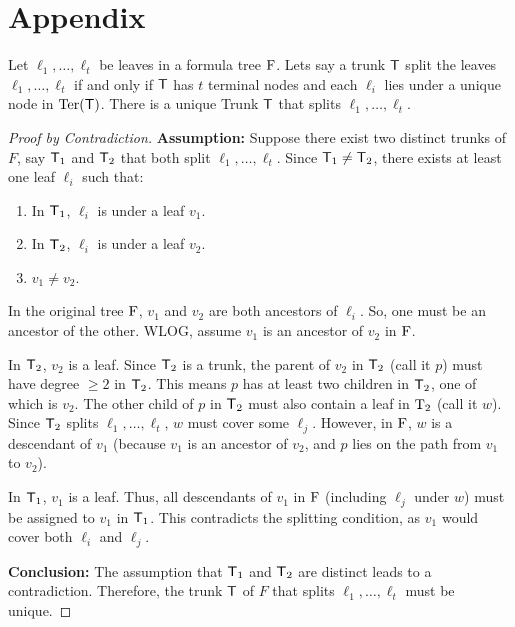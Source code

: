 \section*{Appendix}
\begin{claim}
\label{claim:leaf_branching_uniqueness}
Let $\ell_1, \dots , \ell_t$ be leaves in a formula tree $\rm F$. Lets say a trunk $\mathsf{T}$ split the leaves $\ell_1, \dots , \ell_t$ if and only if $\mathsf{T}$ has $t$ terminal nodes and each $\ell_i$ lies under a unique node in $\mathrm{Ter}(\mathsf{T})$.  
There is a unique Trunk $\mathsf{T}$ that splits $\ell_1, \dots , \ell_t$.
\end{claim}
\begin{proof}[Proof by Contradiction]
\textbf{Assumption:} Suppose there exist two distinct trunks of $F$, say  $\mathsf{T}_1$ and $\mathsf{T}_2$ that both split $\ell_1, \dots , \ell_t$.
Since $\mathsf{T}_1 \neq \mathsf{T}_2$, there exists at least one leaf $\ell_i$ such that:
\begin{enumerate}
    \item In $\mathsf{T}_1$, $\ell_i$ is under a leaf $v_1$.
    \item In $\mathsf{T}_2$, $\ell_i$ is under a leaf $v_2$.
    \item $v_1 \neq v_2$.
\end{enumerate}
In the original tree $\rm F$, $v_1$ and $v_2$ are both ancestors of $\ell_i$. So, one must be an ancestor of the other. WLOG, assume $v_1$ is an ancestor of $v_2$ in $\rm F$.

In $\mathsf{T}_2$, $v_2$ is a leaf. Since $\mathsf{T}_2$ is a trunk, the parent of $v_2$ in $\mathsf{T}_2$ (call it $p$) must have degree $\ge 2$ in $\rm \mathsf{T}_2$. This means $p$ has at least two children in $\rm \mathsf{T}_2$, one of which is $v_2$.
The other child of $p$ in $\rm \mathsf{T}_2$ must also contain a leaf in $\rm T_2$ (call it $w$). Since $\rm \mathsf{T}_2$ splits $\ell_1, \dots ,\ell_t$, $w$ must cover some $\ell_j$. However, in $\rm F$, $w$ is a descendant of $v_1$ (because $v_1$ is an ancestor of $v_2$, and $p$ lies on the path from $v_1$ to $v_2$).

In $\rm \mathsf{T}_1$, $v_1$ is a leaf. Thus, all descendants of $v_1$ in $\rm F$ (including $\ell_j$ under $w$) must be assigned to $v_1$ in $\rm \mathsf{T}_1$. This contradicts the splitting condition, as $v_1$ would cover both $\ell_i$ and $\ell_j$.

\textbf{Conclusion:} The assumption that $\rm \mathsf{T}_1$ and $\rm \mathsf{T}_2$ are distinct leads to a contradiction. Therefore, the trunk $\mathsf{T}$ of $F$ that splits $\ell_1, \dots , \ell_t$ must be unique.
\end{proof}